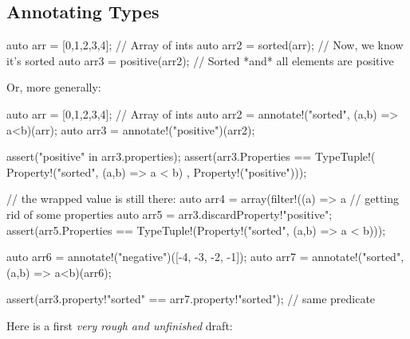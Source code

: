 \subsection{Annotating Types}\label{annotatingtypes}


\begin{dcode}
auto arr = [0,1,2,3,4]; // Array of ints
auto arr2 = sorted(arr); // Now, we know it's sorted
auto arr3 = positive(arr2); // Sorted *and* all elements are positive
\end{dcode}

Or, more generally:

\begin{dcode}
auto arr = [0,1,2,3,4]; // Array of ints
auto arr2 = annotate!("sorted", (a,b) => a<b)(arr);
auto arr3 = annotate!("positive")(arr2);

assert("positive" in arr3.properties);
assert(arr3.Properties == TypeTuple!( Property!("sorted", (a,b) => a < b)
                                    , Property!("positive")));

// the wrapped value is still there:             
auto arr4 = array(filter!((a) => a%
// getting rid of some properties
auto arr5 = arr3.discardProperty!"positive"; 
assert(arr5.Properties == TypeTuple!(Property!("sorted", (a,b) => a < b)));

auto arr6 = annotate!("negative")([-4, -3, -2, -1]);
auto arr7 = annotate!("sorted", (a,b) => a<b)(arr6);

assert(arr3.property!"sorted" == arr7.property!"sorted"); // same predicate                                    
\end{dcode}

Here is a first \emph{very rough and unfinished} draft:

